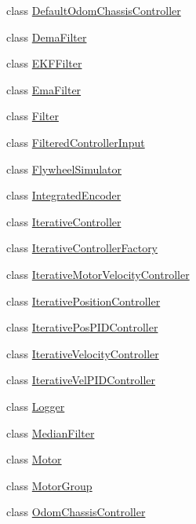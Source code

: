 \begin{DoxyCompactItemize}
\item 
class \mbox{\hyperlink{classokapi_1_1DefaultOdomChassisController}{Default\+Odom\+Chassis\+Controller}}
\item 
class \mbox{\hyperlink{classokapi_1_1DemaFilter}{Dema\+Filter}}
\item 
class \mbox{\hyperlink{classokapi_1_1EKFFilter}{E\+K\+F\+Filter}}
\item 
class \mbox{\hyperlink{classokapi_1_1EmaFilter}{Ema\+Filter}}
\item 
class \mbox{\hyperlink{classokapi_1_1Filter}{Filter}}
\item 
class \mbox{\hyperlink{classokapi_1_1FilteredControllerInput}{Filtered\+Controller\+Input}}
\item 
class \mbox{\hyperlink{classokapi_1_1FlywheelSimulator}{Flywheel\+Simulator}}
\item 
class \mbox{\hyperlink{classokapi_1_1IntegratedEncoder}{Integrated\+Encoder}}
\item 
class \mbox{\hyperlink{classokapi_1_1IterativeController}{Iterative\+Controller}}
\item 
class \mbox{\hyperlink{classokapi_1_1IterativeControllerFactory}{Iterative\+Controller\+Factory}}
\item 
class \mbox{\hyperlink{classokapi_1_1IterativeMotorVelocityController}{Iterative\+Motor\+Velocity\+Controller}}
\item 
class \mbox{\hyperlink{classokapi_1_1IterativePositionController}{Iterative\+Position\+Controller}}
\item 
class \mbox{\hyperlink{classokapi_1_1IterativePosPIDController}{Iterative\+Pos\+P\+I\+D\+Controller}}
\item 
class \mbox{\hyperlink{classokapi_1_1IterativeVelocityController}{Iterative\+Velocity\+Controller}}
\item 
class \mbox{\hyperlink{classokapi_1_1IterativeVelPIDController}{Iterative\+Vel\+P\+I\+D\+Controller}}
\item 
class \mbox{\hyperlink{classokapi_1_1Logger}{Logger}}
\item 
class \mbox{\hyperlink{classokapi_1_1MedianFilter}{Median\+Filter}}
\item 
class \mbox{\hyperlink{classokapi_1_1Motor}{Motor}}
\item 
class \mbox{\hyperlink{classokapi_1_1MotorGroup}{Motor\+Group}}
\item 
class \mbox{\hyperlink{classokapi_1_1OdomChassisController}{Odom\+Chassis\+Controller}}
\item 

\end{DoxyCompactItemize}
